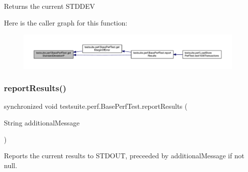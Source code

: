 \begin{DoxyReturn}{Returns}
the current S\+T\+D\+D\+EV 
\end{DoxyReturn}
Here is the caller graph for this function\+:
\nopagebreak
\begin{figure}[H]
\begin{center}
\leavevmode
\includegraphics[width=350pt]{classtestsuite_1_1perf_1_1_base_perf_test_a72145770043104a1fe0a8a1648044aed_icgraph}
\end{center}
\end{figure}
\mbox{\label{classtestsuite_1_1perf_1_1_base_perf_test_a88bddb3492e88ede49a0b70c63dc47b1}} 
\subsubsection{\texorpdfstring{report\+Results()}{reportResults()}}
{\footnotesize\ttfamily synchronized void testsuite.\+perf.\+Base\+Perf\+Test.\+report\+Results (\begin{DoxyParamCaption}\item[{String}]{additional\+Message }\end{DoxyParamCaption})\hspace{0.3cm}{\ttfamily [protected]}}

Reports the current results to S\+T\+D\+O\+UT, preceeded by {\ttfamily additional\+Message} if not null.


